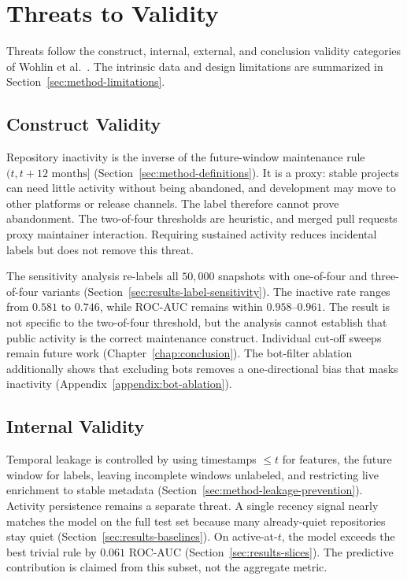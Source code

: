 \chapter{Threats to Validity}
\label{chap:validity}

Threats follow the construct, internal, external, and conclusion validity
categories of Wohlin et al.\ \cite{wohlin2012experimentation}. The intrinsic data
and design limitations are summarized in
Section~\ref{sec:method-limitations}.

\section{Construct Validity}
\label{sec:validity-construct}

Repository inactivity is the inverse of the future-window maintenance rule
\((t, t + 12\text{ months}]\)
(Section~\ref{sec:method-definitions}). It is a proxy: stable projects can need
little activity without being abandoned, and development may move to other
platforms or release channels. The label therefore cannot prove abandonment.
The two-of-four thresholds are heuristic, and merged pull requests proxy
maintainer interaction. Requiring sustained activity reduces incidental labels
but does not remove this threat.

The sensitivity analysis re-labels all \(50{,}000\) snapshots with one-of-four
and three-of-four variants (Section~\ref{sec:results-label-sensitivity}). The
inactive rate ranges from \(0.581\) to \(0.746\), while ROC-AUC remains within
\(0.958\)--\(0.961\). The result is not specific to the two-of-four threshold,
but the analysis cannot establish that public activity is the correct maintenance
construct. Individual cut-off sweeps remain future work
(Chapter~\ref{chap:conclusion}). The bot-filter ablation additionally shows that
excluding bots removes a one-directional bias that masks inactivity
(Appendix~\ref{appendix:bot-ablation}).

\section{Internal Validity}
\label{sec:validity-internal}

Temporal leakage is controlled by using timestamps \(\leq t\) for features, the
future window for labels, leaving incomplete windows unlabeled, and restricting
live enrichment to stable metadata
(Section~\ref{sec:method-leakage-prevention}). Activity persistence remains a
separate threat. A single recency signal nearly matches the model on the full
test set because many already-quiet repositories stay quiet
(Section~\ref{sec:results-baselines}). On active-at-\(t\), the model exceeds the
best trivial rule by \(0.061\) ROC-AUC
(Section~\ref{sec:results-slices}). The predictive contribution is claimed from
this subset, not the aggregate metric.


